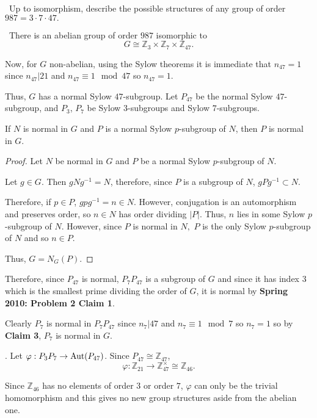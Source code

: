 \documentclass[12pt]{AlgebraQual}
\begin{document}
\begin{problem} $\,$
Up to isomorphism, describe the possible structures of any group of order $987=3\cdot 7\cdot 47.$
\end{problem}


\begin{solution}$\,$
 There is an abelian group of order $987$ isomorphic to $$G\cong\mathbb{Z}_3\times\mathbb{Z}_7\times\mathbb{Z}_{47}.$$

Now, for $G$ non-abelian, using the Sylow theorems it is immediate that $n_{47}=1$ since $n_{47}|21$ and $n_{47}\equiv 1\mod 47$ so $n_{47}=1$.

Thus, $G$ has a normal Sylow $47$-subgroup. Let $P_{47}$ be the normal Sylow $47$-subgroup, and $P_3$, $P_7$ be Sylow $3$-subgroups and Sylow $7$-subgroups.

\begin{claim} If $N$ is normal in $G$ and $P$ is a normal Sylow $p$-subgroup of $N$, then $P$ is normal in $G$.
\begin{proof} Let $N$ be normal in $G$ and $P$ be a normal Sylow $p$-subgroup of $N$.

Let $g\in G$. Then $gNg^{-1}=N$, therefore, since $P$ is a subgroup of $N$, $gPg^{-1}\subset N$.

Therefore, if $p\in P$, $gpg^{-1}=n\in N$. However, conjugation is an automorphism and preserves order, so $n\in N$ has order dividing $|P|$. Thus, $n$ lies in some Sylow $p$-subgroup of $N.$ However, since $P$ is normal in $N,$ $P$ is the only Sylow $p$-subgroup of $N$ and so $n\in P$.

Thus, $G=N_G(P)$.
\end{proof}
\end{claim}

Therefore, since $P_{47}$ is normal, $P_7P_{47}$ is a subgroup of $G$ and since it has index $3$ which is the smallest prime dividing the order of $G$, it is normal by \textbf{Spring 2010: Problem 2 Claim 1}.

Clearly $P_7$ is normal in $P_7P_{47}$ since $n_7|47$ and $n_7\equiv 1\mod 7$ so $n_7=1$ so by \textbf{Claim 3}, $P_7$ is normal in $G.$

. Let $\varphi:P_3P_7\to\text{Aut}(P_{47})$. Since $P_{47}\cong\mathbb{Z}_{47}$, $$\varphi:\mathbb{Z}_{21}\to\mathbb{Z}_{47}^\times\cong\mathbb{Z}_{46}.$$

Since $\mathbb{Z}_{46}$ has no elements of order $3$ or order $7$, $\varphi$ can only be the trivial homomorphism and this gives no new group structures aside from the abelian one.


\end{solution}
\end{document}
